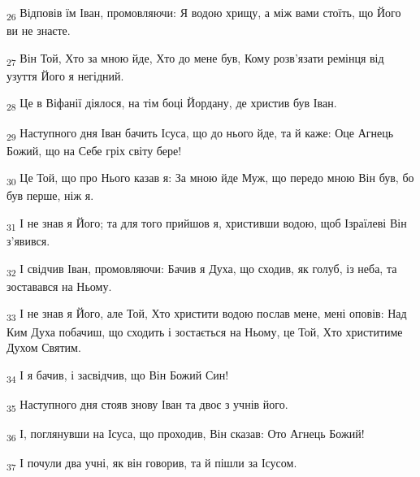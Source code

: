 \begin{tcolorbox}
\textsubscript{26} Відповів їм Іван, промовляючи: Я водою хрищу, а між вами стоїть, що Його ви не знаєте.
\end{tcolorbox}
\begin{tcolorbox}
\textsubscript{27} Він Той, Хто за мною йде, Хто до мене був, Кому розв'язати ремінця від узуття Його я негідний.
\end{tcolorbox}
\begin{tcolorbox}
\textsubscript{28} Це в Віфанії діялося, на тім боці Йордану, де христив був Іван.
\end{tcolorbox}
\begin{tcolorbox}
\textsubscript{29} Наступного дня Іван бачить Ісуса, що до нього йде, та й каже: Оце Агнець Божий, що на Себе гріх світу бере!
\end{tcolorbox}
\begin{tcolorbox}
\textsubscript{30} Це Той, що про Нього казав я: За мною йде Муж, що передо мною Він був, бо був перше, ніж я.
\end{tcolorbox}
\begin{tcolorbox}
\textsubscript{31} І не знав я Його; та для того прийшов я, христивши водою, щоб Ізраїлеві Він з'явився.
\end{tcolorbox}
\begin{tcolorbox}
\textsubscript{32} І свідчив Іван, промовляючи: Бачив я Духа, що сходив, як голуб, із неба, та зоставався на Ньому.
\end{tcolorbox}
\begin{tcolorbox}
\textsubscript{33} І не знав я Його, але Той, Хто христити водою послав мене, мені оповів: Над Ким Духа побачиш, що сходить і зостається на Ньому, це Той, Хто христитиме Духом Святим.
\end{tcolorbox}
\begin{tcolorbox}
\textsubscript{34} І я бачив, і засвідчив, що Він Божий Син!
\end{tcolorbox}
\begin{tcolorbox}
\textsubscript{35} Наступного дня стояв знову Іван та двоє з учнів його.
\end{tcolorbox}
\begin{tcolorbox}
\textsubscript{36} І, поглянувши на Ісуса, що проходив, Він сказав: Ото Агнець Божий!
\end{tcolorbox}
\begin{tcolorbox}
\textsubscript{37} І почули два учні, як він говорив, та й пішли за Ісусом.
\end{tcolorbox}
